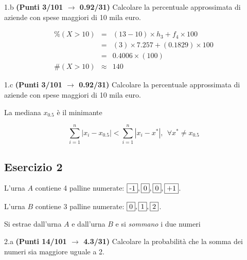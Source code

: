 \documentclass[
  11pt,
]{book}
\theoremstyle{mytheoremstyle}
\theoremstyle{mydefstyle}
\newenvironment{sol}
  {
  \begin{tcolorbox}[enhanced,breakable,arc=0.1mm,boxrule=1pt,colback=white,colframe=iblue,
  title=\bf \fontfamily{lmss}\selectfont \hspace{.5 cm} Soluzione,drop fuzzy shadow]

}{
\end{tcolorbox}
  }
\begin{document}
1.b \textbf{(Punti 3/101 \(\rightarrow\) 0.92/31)} Calcolare la percentuale approssimata di aziende
con spese maggiori di 10 mila euro.

\begin{sol}
\begin{eqnarray*}
     \%(X> 10 ) &=& ( 13 - 10 )\times h_{ 3 }+ f_{ 4 }\times 100 \\
              &=& ( 3 )\times 7.257 + ( 0.1829 )\times 100 \\
              &=&  0.4006 \times(100)\\
     \#(X> 10 ) &\approx& 140 
         \end{eqnarray*}

\end{sol}

1.c \textbf{(Punti 3/101 \(\rightarrow\) 0.92/31)} Calcolare la percentuale approssimata di aziende
con spese maggiori di 10 mila euro.

\begin{sol}
La mediana \(x_{0.5}\) è il minimante

\[
\sum_{i=1}^n|x_i-x_{0.5}|<\sum_{i=1}^n|x_i-x^*|, ~~\forall x^*\neq x_{0.5}
\]

\end{sol}

\subsection{Esercizio 2}\label{esercizio-2-5}

L'urna \(A\) contiene 4 palline numerate: \(\fbox{-1},\fbox{0},\fbox{0},\fbox{+1}\).

L'urna \(B\) contiene 3 palline numerate: \(\fbox{0},\fbox{1},\fbox{2}\).

Si estrae dall'urna \(A\) e dall'urna \(B\) e si \emph{sommano} i due numeri

2.a \textbf{(Punti 14/101 \(\rightarrow\) 4.3/31)} Calcolare la probabilità che la somma dei numeri sia maggiore uguale a 2.
\end{document}
